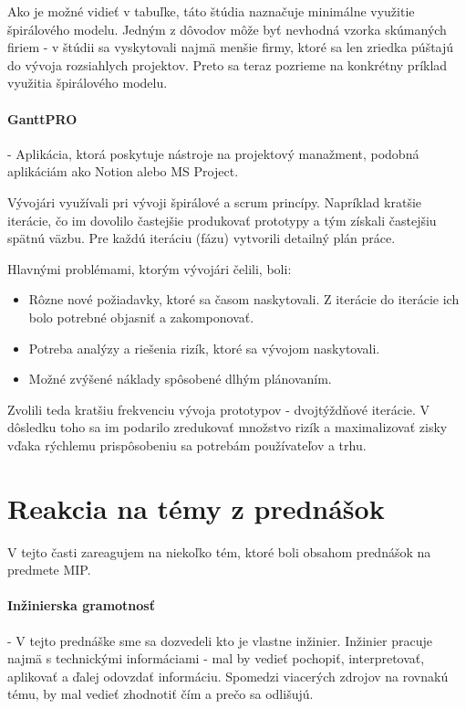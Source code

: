 \documentclass[10pt,twoside,slovak,a4paper]{article}
\begin{document}
Ako je možné vidieť v tabuľke, táto štúdia naznačuje minimálne využitie špirálového modelu. Jedným z dôvodov môže byť nevhodná vzorka skúmaných firiem - v štúdii sa vyskytovali najmä menšie firmy, ktoré sa len zriedka púštajú do vývoja rozsiahlych projektov. Preto sa teraz pozrieme na konkrétny príklad využitia špirálového modelu.

\paragraph{GanttPRO} - Aplikácia, ktorá poskytuje nástroje na projektový manažment, podobná aplikáciám ako Notion alebo MS Project.

Vývojári využívali pri vývoji špirálové a scrum princípy. Napríklad kratšie iterácie, čo im dovolilo častejšie produkovať prototypy a tým získali častejšiu spätnú väzbu. Pre každú iteráciu (fázu) vytvorili detailný plán práce.

Hlavnými problémami, ktorým vývojári čelili, boli:
\begin{itemize}
\item Rôzne nové požiadavky, ktoré sa časom naskytovali. Z iterácie do iterácie ich bolo potrebné objasniť a zakomponovať.
\item Potreba analýzy a riešenia rizík, ktoré sa vývojom naskytovali.
\item Možné zvýšené náklady spôsobené dlhým plánovaním.
\end{itemize}
Zvolili teda kratšiu frekvenciu vývoja prototypov - dvojtýždňové iterácie. V dôsledku toho sa im podarilo zredukovať množstvo rizík a maximalizovať zisky vďaka rýchlemu prispôsobeniu sa potrebám používateľov a trhu. \cite{SpiralModelExample}

\section{Reakcia na témy z prednášok} \label{reakciaNaTemy}
V tejto časti zareagujem na niekoľko tém, ktoré boli obsahom prednášok na predmete MIP.

 \paragraph{Inžinierska gramotnosť} - V tejto prednáške sme sa dozvedeli kto je vlastne inžinier. Inžinier pracuje najmä s technickými informáciami - mal by vedieť pochopiť, interpretovať, aplikovať a ďalej odovzdať informáciu. Spomedzi viacerých zdrojov na rovnakú tému, by mal vedieť zhodnotiť čím a prečo sa odlišujú.
\end{document}

